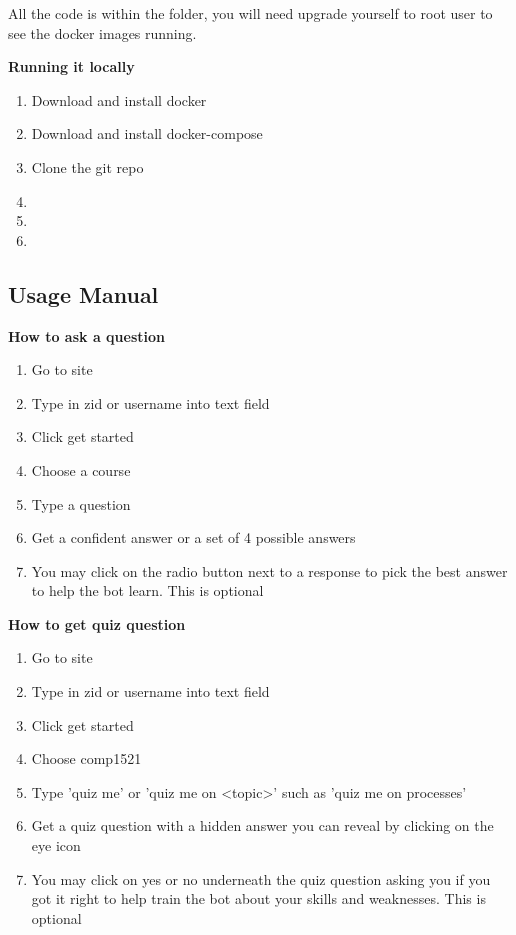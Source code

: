 All the code is within the  folder, you will need upgrade yourself to root user 
to see the docker images running.

\textbf{Running it locally}

\begin{enumerate}
	\item{Download and install docker}
	\item{Download and install docker-compose}
	\item{Clone the git repo}
	\item{}
	\item{}
	\item{}
\end{enumerate}

\subsection{Usage Manual}

\textbf{How to ask a question}
\begin{enumerate}
	\item {Go to site}
	\item {Type in zid or username into text field}
	\item {Click get started}
	\item {Choose a course}
	\item {Type a question}
	\item {Get a confident answer or a set of 4 possible answers}
	\item {You may click on the radio button next to a response to pick the best answer to help the bot learn. This is optional}
\end{enumerate}

\textbf{How to get quiz question}
\begin{enumerate}
	\item {Go to site}
	\item {Type in zid or username into text field}
	\item {Click get started}
	\item {Choose comp1521}
	\item {Type 'quiz me' or 'quiz me on <topic>' such as 'quiz me on processes'}
	\item {Get a quiz question with a hidden answer you can reveal by clicking on the eye icon }
	\item {You may click on yes or no underneath the quiz question asking you if you got it right to help train the bot about your skills and weaknesses. This is optional}
\end{enumerate}

